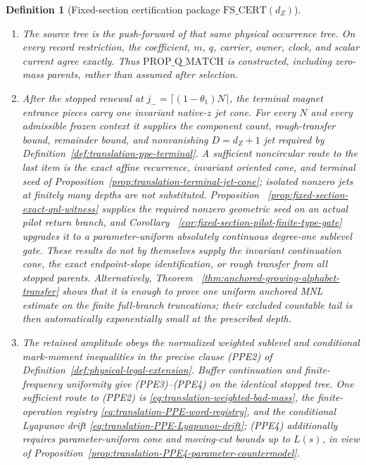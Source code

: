 \documentclass[11pt]{article}
\newtheorem{definition}[theorem]{Definition}
\begin{document}
\begin{definition}[Fixed-section certification package
$\mathrm{FS\_CERT}(d_Z)$]
\begin{enumerate}[label=\textup{(FS\arabic*)}]
\begin{enumerate}[label=\textup{(FS3\alph*)}]
mass of a rare owner and therefore asks for no hereditary conditional
moment.
\end{enumerate}
\item The source tree is the push-forward of that same physical occurrence
tree.  On every record restriction, the coefficient, $m$, $q$, carrier,
owner, clock, and scalar current agree exactly.  Thus
$\mathrm{PROP\_Q\_MATCH}$ is constructed, including zero-mass parents,
rather than assumed after selection.
\item After the stopped renewal at
$j_- =\lceil(1-\theta_1)N\rceil$, the terminal magnet entrance pieces carry
one invariant native-$z$ jet cone.  For every $N$ and every admissible frozen
context it supplies the component count, rough-transfer bound, remainder
bound, and nonvanishing $D=d_Z+1$ jet required by
Definition~\ref{def:translation-ppe-terminal}.  A sufficient noncircular
route to the last item is the exact affine recurrence, invariant oriented
cone, and terminal seed of
Proposition~\ref{prop:translation-terminal-jet-cone}; isolated nonzero jets
at finitely many depths are not substituted.  Proposition~
\ref{prop:fixed-section-exact-qnl-witness} supplies the required nonzero
geometric seed on an actual pilot return branch, and Corollary~
\ref{cor:fixed-section-pilot-finite-type-gate} upgrades it to a
parameter-uniform absolutely continuous degree-one sublevel gate.  These
results do not by themselves supply the invariant continuation cone, the
exact endpoint-slope identification, or rough transfer from all stopped
parents.  Alternatively, Theorem~
\ref{thm:anchored-growing-alphabet-transfer} shows that it is enough to prove
one uniform anchored MNL estimate on the finite full-branch truncations;
their excluded countable tail is then automatically exponentially small at
the prescribed depth.
\item The retained amplitude obeys the normalized weighted sublevel and
conditional mark-moment inequalities in the precise clause \textup{(PPE2)}
of Definition~\ref{def:physical-legal-extension}.  Buffer
continuation and finite-frequency uniformity give \textup{(PPE3)--(PPE4)}
on the identical stopped tree.  One sufficient route to \textup{(PPE2)} is
\eqref{eq:translation-weighted-bad-mass}, the finite-operation registry
\eqref{eq:translation-PPE-word-registry}, and the conditional Lyapunov drift
\eqref{eq:translation-PPE-Lyapunov-drift}; \textup{(PPE4)} additionally
requires parameter-uniform cone and moving-cut bounds up to $L(s)$, in view
of Proposition~\ref{prop:translation-PPE4-parameter-countermodel}.

\end{enumerate}
\end{definition}
\end{document}
